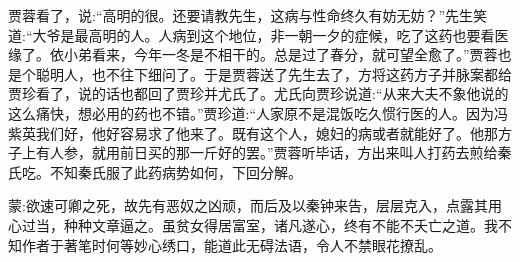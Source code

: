 \begin{parag}
    贾蓉看了，说:“高明的很。还要请教先生，这病与性命终久有妨无妨？”先生笑道:“大爷是最高明的人。人病到这个地位，非一朝一夕的症候，吃了这药也要看医缘了。依小弟看来，今年一冬是不相干的。总是过了春分，就可望全愈了。”贾蓉也是个聪明人，也不往下细问了。于是贾蓉送了先生去了，方将这药方子并脉案都给贾珍看了，说的话也都回了贾珍并尤氏了。尤氏向贾珍说道:“从来大夫不象他说的这么痛快，想必用的药也不错。”贾珍道:“人家原不是混饭吃久惯行医的人。因为冯紫英我们好，他好容易求了他来了。既有这个人，媳妇的病或者就能好了。他那方子上有人参，就用前日买的那一斤好的罢。”贾蓉听毕话，方出来叫人打药去煎给秦氏吃。不知秦氏服了此药病势如何，下回分解。
\end{parag}


\begin{parag}
    \begin{note}蒙:欲速可卿之死，故先有恶奴之凶顽，而后及以秦钟来告，层层克入，点露其用心过当，种种文章逼之。虽贫女得居富室，诸凡遂心，终有不能不夭亡之道。我不知作者于著笔时何等妙心绣口，能道此无碍法语，令人不禁眼花撩乱。\end{note}
\end{parag}
